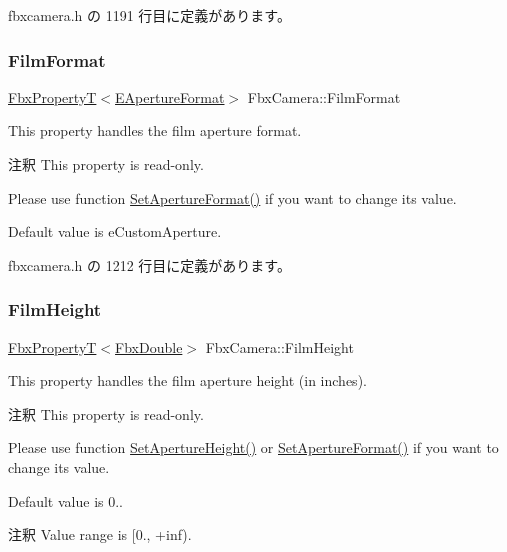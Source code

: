  fbxcamera.\+h の 1191 行目に定義があります。

\mbox{\label{class_fbx_camera_a49ebaef59ee49281225e2d0652894a4f}} 
\subsubsection{\texorpdfstring{Film\+Format}{FilmFormat}}
{\footnotesize\ttfamily \hyperlink{class_fbx_property_t}{Fbx\+PropertyT}$<$\hyperlink{class_fbx_camera_ac26ac89602453c5917882c69d4863d13}{E\+Aperture\+Format}$>$ Fbx\+Camera\+::\+Film\+Format}

This property handles the film aperture format.

\begin{DoxyRemark}{注釈}
This property is read-\/only. 

Please use function \hyperlink{class_fbx_camera_a5b644b41e4d72c214acfdb5a2dee7576}{Set\+Aperture\+Format()} if you want to change its value.
\end{DoxyRemark}
Default value is e\+Custom\+Aperture. 

 fbxcamera.\+h の 1212 行目に定義があります。

\mbox{\label{class_fbx_camera_ae8e2abec912de996c4eaaff987a3bd17}} 
\subsubsection{\texorpdfstring{Film\+Height}{FilmHeight}}
{\footnotesize\ttfamily \hyperlink{class_fbx_property_t}{Fbx\+PropertyT}$<$\hyperlink{fbxtypes_8h_a171e72a1c46fc15c1a6c9c31948c1c5b}{Fbx\+Double}$>$ Fbx\+Camera\+::\+Film\+Height}

This property handles the film aperture height (in inches).

\begin{DoxyRemark}{注釈}
This property is read-\/only. 

Please use function \hyperlink{class_fbx_camera_a02bdb12abf27b4ccc0c4554818bdbf8f}{Set\+Aperture\+Height()} or \hyperlink{class_fbx_camera_a5b644b41e4d72c214acfdb5a2dee7576}{Set\+Aperture\+Format()} if you want to change its value.
\end{DoxyRemark}
Default value is 0.. \begin{DoxyRemark}{注釈}
Value range is \mbox{[}0., +inf). 
\end{DoxyRemark}


